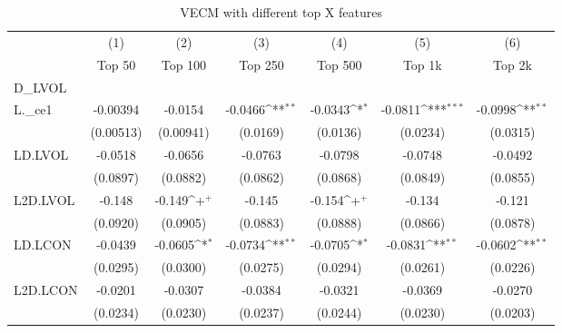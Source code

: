 \begin{table}
\begin{center}
\caption[VECM Results Diff. Top X Features]{VECM with different top X features\label{vec3}}
\vspace{0.3in}
{
\def\sym#1{\ifmmode^{#1}\else\(^{#1}\)\fi}
\begin{tabular}{l*{6}{c}}
\hline\hline
          &\multicolumn{1}{c}{(1)}&\multicolumn{1}{c}{(2)}&\multicolumn{1}{c}{(3)}&\multicolumn{1}{c}{(4)}&\multicolumn{1}{c}{(5)}&\multicolumn{1}{c}{(6)}\\
          &\multicolumn{1}{c}{Top 50}&\multicolumn{1}{c}{Top 100}&\multicolumn{1}{c}{Top 250}&\multicolumn{1}{c}{Top 500}&\multicolumn{1}{c}{Top 1k}&\multicolumn{1}{c}{Top 2k}\\
\hline
D\_LVOL    &                  &                  &                  &                  &                  &                  \\
L.\_ce1    & -0.00394         &  -0.0154         &  -0.0466\sym{**} &  -0.0343\sym{*}  &  -0.0811\sym{***}&  -0.0998\sym{**} \\
          &(0.00513)         &(0.00941)         & (0.0169)         & (0.0136)         & (0.0234)         & (0.0315)         \\
LD.LVOL   &  -0.0518         &  -0.0656         &  -0.0763         &  -0.0798         &  -0.0748         &  -0.0492         \\
          & (0.0897)         & (0.0882)         & (0.0862)         & (0.0868)         & (0.0849)         & (0.0855)         \\
L2D.LVOL  &   -0.148         &   -0.149\sym{+}  &   -0.145         &   -0.154\sym{+}  &   -0.134         &   -0.121         \\
          & (0.0920)         & (0.0905)         & (0.0883)         & (0.0888)         & (0.0866)         & (0.0878)         \\
LD.LCON   &  -0.0439         &  -0.0605\sym{*}  &  -0.0734\sym{**} &  -0.0705\sym{*}  &  -0.0831\sym{**} &  -0.0602\sym{**} \\
          & (0.0295)         & (0.0300)         & (0.0275)         & (0.0294)         & (0.0261)         & (0.0226)         \\
L2D.LCON  &  -0.0201         &  -0.0307         &  -0.0384         &  -0.0321         &  -0.0369         &  -0.0270         \\
          & (0.0234)         & (0.0230)         & (0.0237)         & (0.0244)         & (0.0230)         & (0.0203)         \\

\end{tabular}}
\end{center}
\end{table}

